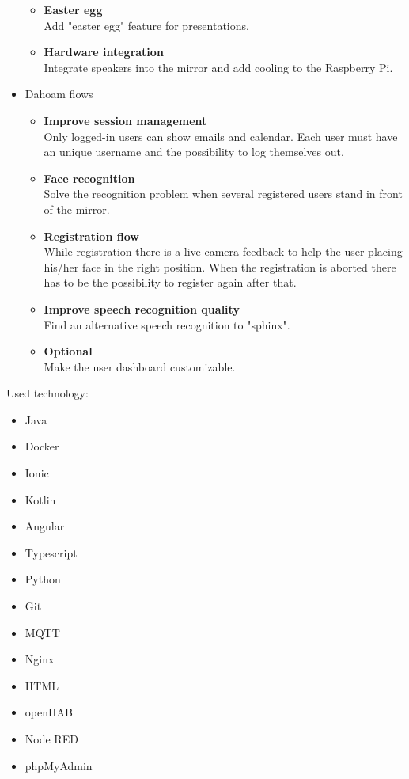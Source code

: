 \documentclass[12pt]{article}
\theoremstyle{definition}
\begin{document}
\begin{itemize}
\begin{itemize}
    \item \textbf{Easter egg}\\
        Add "easter egg" feature for presentations.
    \item \textbf{Hardware integration}\\
        Integrate speakers into the mirror and add cooling to the Raspberry Pi.\\
    \end{itemize}
    \item Dahoam flows
    \begin{itemize} \\
        \item \textbf{Improve session management}\\
        Only logged-in users can show emails and calendar. Each user must have an unique username and the possibility to log themselves out.
        \item \textbf{Face recognition}\\
        Solve the recognition problem when several registered users stand in front of the mirror.
        \item \textbf{Registration flow}\\
        While registration there is a live camera feedback to help the user placing his/her face in the right position. When the registration is aborted there has to be the possibility to register again after that.
        \item \textbf{Improve speech recognition quality}\\
        Find an alternative speech recognition to "sphinx".
        \item \textbf{Optional}\\
        Make the user dashboard customizable.
    \end{itemize}
\end{itemize}
\pagebreak
Used technology:
\begin{itemize}
    \item Java
    \item Docker
    \item Ionic
    \item Kotlin
    \item Angular
    \item Typescript
    \item Python
    \item Git
    \item MQTT
    \item Nginx
    \item HTML
    \item openHAB
    \item Node RED
    \item phpMyAdmin
\end{itemize}
\end{document}
